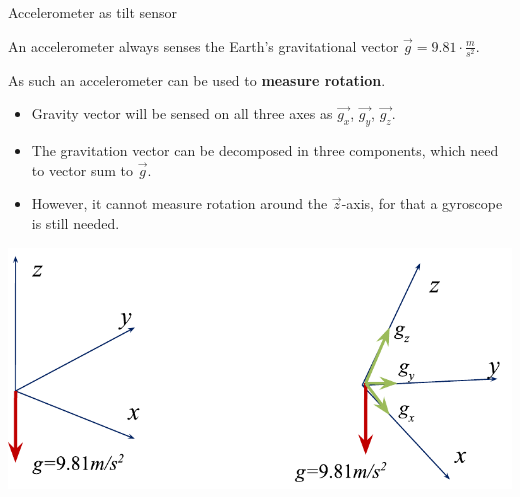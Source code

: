 \documentclass[compress]{beamer}
\begin{document}
\begin{frame}{Accelerometer as tilt sensor}

    An accelerometer always senses the Earth's gravitational vector $\vec{g} = 9.81\cdot\frac{m}{s^2}$.

    As such an accelerometer can be used to \textbf{measure rotation}.

    \begin{itemize}
        \item Gravity vector will be sensed on all three axes as $\vec{g_x}$, $\vec{g_y}$, $\vec{g_z}$.

        \item The gravitation vector can be decomposed in three components, which
              need to vector sum to $\vec{g}$.

          \item However, it cannot measure rotation around the $\vec{z}$-axis, for that a
              gyroscope is still needed.

    \end{itemize}

    \begin{center}
        \includegraphics[width=0.5\linewidth]{accelero_tilt}
    \end{center}

\end{frame}

\end{document}
